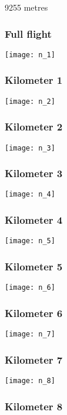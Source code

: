 \documentclass[]{article}
\begin{document}
9255 metres

\subsubsection{Full flight}\label{full-flight-13}

\texttt{[image: n\_1]}

\subsubsection{Kilometer 1}\label{kilometer-1-13}

\texttt{[image: n\_2]}

\subsubsection{Kilometer 2}\label{kilometer-2-13}

\texttt{[image: n\_3]}

\subsubsection{Kilometer 3}\label{kilometer-3-13}

\texttt{[image: n\_4]}

\subsubsection{Kilometer 4}\label{kilometer-4-13}

\texttt{[image: n\_5]}

\subsubsection{Kilometer 5}\label{kilometer-5-13}

\texttt{[image: n\_6]}

\subsubsection{Kilometer 6}\label{kilometer-6-10}

\texttt{[image: n\_7]}

\subsubsection{Kilometer 7}\label{kilometer-7-7}

\texttt{[image: n\_8]}

\subsubsection{Kilometer 8}\label{kilometer-8-3}
\end{document}
